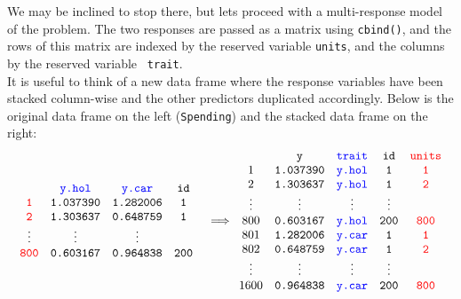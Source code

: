 \documentclass{article}
\begin{document}
 We may be inclined to stop there, but lets proceed with a multi-response model of the problem. The two responses are passed as a matrix using \texttt{cbind()}, and the rows of this matrix are indexed by the reserved variable {\color{red} \texttt{units}}, and the columns by the reserved variable \texttt{\color{blue} \texttt{trait}}.\\ 

It is useful to think of a new data frame where the response variables have been stacked column-wise and the other predictors duplicated accordingly. Below is the original data frame on the left (\texttt{Spending}) and the stacked data frame on the right:\\  

\begin{displaymath}
\begin{array}{cc}
\begin{array}{cccc}
&{\color{blue} \texttt{y.hol}}&{\color{blue} \texttt{y.car}}&\texttt{id}\\
{\color{red} \texttt{1}}&\texttt{1.037390}&\texttt{1.282006}&\texttt{1}\\
{\color{red} \texttt{2}}&\texttt{1.303637}&\texttt{0.648759}&\texttt{1}\\
\vdots&\vdots&\vdots\\
{\color{red} \texttt{800}}&\texttt{0.603167}&\texttt{0.964838}&\texttt{200}\\
\end{array}&
\Longrightarrow
\begin{array}{ccccc}
&\texttt{y}&{\color{blue} \texttt{trait}}&\texttt{id}&{\color{red} \texttt{units}}\\
1&\texttt{1.037390}&{\color{blue} \texttt{y.hol}}&\texttt{1}&{\color{red} \texttt{1}}\\
2&\texttt{1.303637}&{\color{blue} \texttt{y.hol}}&\texttt{1}&{\color{red} \texttt{2}}\\
\vdots&\vdots&\vdots&\vdots\\
800&\texttt{0.603167}&{\color{blue} \texttt{y.hol}}&\texttt{200}&{\color{red} \texttt{800}}\\
801&\texttt{1.282006}&{\color{blue} \texttt{y.car}}&\texttt{1}&{\color{red} \texttt{1}}\\
802&\texttt{0.648759}&{\color{blue} \texttt{y.car}}&\texttt{1}&{\color{red} \texttt{2}}\\
\vdots&\vdots&\vdots&\vdots\\
1600&\texttt{0.964838}&{\color{blue} \texttt{y.car}}&\texttt{200}&{\color{red} \texttt{800}}\\
\end{array}
\end{array}
\end{displaymath}
\end{document}
